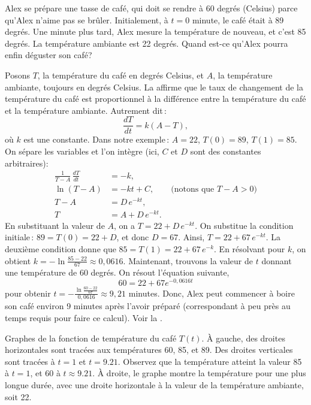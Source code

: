 \begin{example} \label{sep:coffeeexample}
Alex se prépare une tasse de café, qui doit se rendre à 60 degrés (Celsius) parce qu'Alex n'aime pas se brûler.  Initialement, à $t=0$ minute,
le café était à 89 degrés.  Une minute plus tard, Alex mesure la température de nouveau, et c'est 85 degrés.  La température ambiante est 22 degrés.  Quand est-ce qu'Alex pourra enfin déguster son café?

Posons $T$, la température du café en degrés Celsius, et $A$, la température ambiante, toujours en degrés Celsius. La 
 affirme que le taux de changement de la température du café est proportionnel à la différence entre la température du café et la température ambiante.  Autrement dit\,: 
%
\begin{equation*}
\frac{dT}{dt} = k(A-T), 
\end{equation*}
où $k$ est une constante.
Dans notre exemple\,: $A=22$, $T(0) = 89$, $T(1) = 85$.
On sépare les variables et l'on intègre (ici, $C$ et $D$ sont des constantes arbitraires):
\begin{align*}
\frac{1}{T-A} \, \frac{dT}{dt} & = -k , \\
\ln (T-A) &= -kt + C , \qquad \text{(notons que } T-A > 0 \text{)} \\
T-A &= D\, e^{-kt} ,  \\
T &= A + D\, e^{-kt} .
\end{align*}
En substituant la valeur de $A$, on a 
$T = 22 + D\, e^{-kt}$.  On substitue la condition initiale\,: $89 = T(0) = 22 +
D$,
et donc $D = 67$.  Ainsi, 
$T = 22 + 67\, e^{-kt}$.  La deuxième condition donne que $85 = T(1) = 
22 + 67\, e^{-k}$.  En résolvant pour $k$, on obtient 
$k = - \ln \frac{85-22}{67} \approx 0,0616$.  Maintenant, trouvons la valeur de $t$ donnant une température de 60 degrés.  On résout l'équation suivante, 
\begin{equation*}
	60 = 22 + 67 e^{-0,0616t}
\end{equation*}
pour obtenir 
$t = - \frac{\ln \frac{60-22}{67}}{0,0616} \approx 9,21$ minutes.  Donc, Alex peut commencer à boire son café environ 9 minutes après l'avoir préparé (correspondant à peu près au temps requis pour faire ce calcul).  Voir la .










\begin{myfig}
\capstart
\caption{Graphes de la fonction de température du café $T(t)$.
À gauche, des droites horizontales sont tracées aux températures 60, 85, et 89.  Des droites verticales sont tracées à $t=1$ et $t=9.21$.  Observez que la température atteint la valeur 85 à $t=1$, et 60 à 
$t \approx 9.21$.  À droite, le graphe montre la température pour une plus longue durée, avec une droite horizontale à la valeur de la température ambiante, soit 22.\label{sintro:coffeefig}}
\end{myfig}
\end{example}

